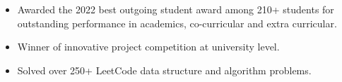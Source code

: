 \smallskip
\begin{itemize}
\item Awarded the 2022 best outgoing student award among 210+ students for outstanding performance in academics, co-curricular and extra curricular.
\item Winner of innovative project competition at university level.
\item Solved over 250+ LeetCode data structure and algorithm problems.
\end{itemize}
\smallskip

